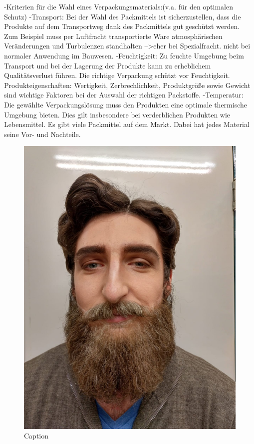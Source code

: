 -Kriterien für die Wahl eines Verpackungsmaterials:(v.a. für den optimalen Schutz) %
    -Transport: Bei der Wahl des Packmittels ist sicherzustellen, dass die Produkte auf dem Transportweg dank des Packmittels gut geschützt werden. Zum Beispiel muss per Luftfracht transportierte Ware atmosphärischen Veränderungen und Turbulenzen standhalten -->eher bei Spezialfracht. nicht bei normaler Anwendung im Bauwesen. 
    -Feuchtigkeit: Zu feuchte Umgebung beim Transport und bei der Lagerung der Produkte kann zu erheblichem Qualitätsverlust führen. Die richtige Verpackung schützt vor Feuchtigkeit.
    Produkteigenschaften: Wertigkeit, Zerbrechlichkeit, Produktgröße sowie Gewicht sind wichtige Faktoren bei der Auswahl der richtigen Packstoffe.
    -Temperatur: Die gewählte Verpackungslösung muss den Produkten eine optimale thermische Umgebung bieten. Dies gilt insbesondere bei verderblichen Produkten wie Lebensmittel.
    Es gibt viele Packmittel auf dem Markt. Dabei hat jedes Material seine Vor- und Nachteile.
    
\begin{figure}
    \centering
    \includegraphics[scale=0.1]{./images/Penner}
    \caption{Caption}
    \label{fig:my_label}
\end{figure}

